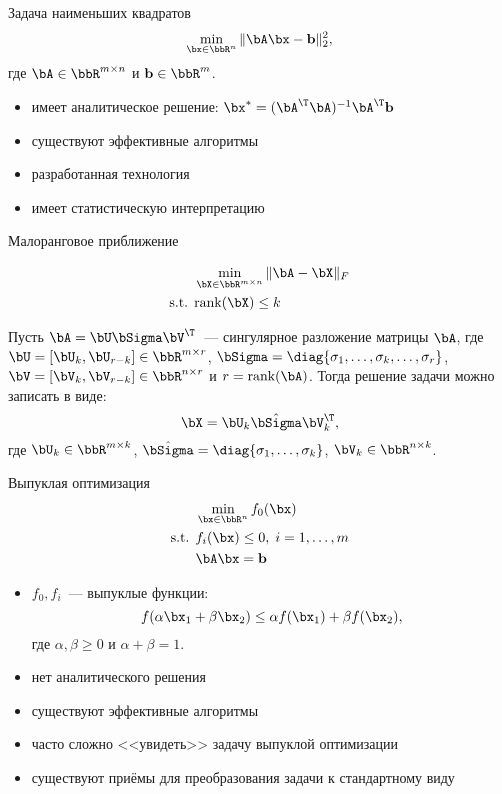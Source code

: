 \documentclass[12pt]{beamer}
\begin{document}
\begin{frame}{Задача наименьших квадратов}
\begin{equation*}
\min\limits_{\bx \in \bbR^n} \|\bA\bx - \mathbf{b} \|^2_2,
\label{eq::least_sq}
\end{equation*}
где $\bA \in \bbR^{m \times n}$ и $\mathbf{b} \in \bbR^m$.
\begin{itemize}
\item имеет аналитическое решение: $\bx^* = (\bA^{\T}\bA)^{-1}\bA^{\T}\mathbf{b}$
\item существуют эффективные алгоритмы
\item разработанная технология
\item имеет статистическую интерпретацию
\end{itemize}
\end{frame}

\begin{frame}{Малоранговое приближение}

\begin{equation*}
\begin{split}
&\min\limits_{\bX \in \bbR^{m \times n}} \|\bA - \bX \|_F \\
\text{s.t. } & \text{rank}(\bX) \leq k
\end{split}
\end{equation*}

\begin{Th}
Пусть $\bA = \bU\bSigma\bV^{\T}$~--- сингулярное разложение матрицы $\bA$, где $\bU = [\bU_k, \bU_{r-k}] \in \bbR^{m \times r}$, $\bSigma = \diag{\sigma_1, \ldots, \sigma_k, \ldots, \sigma_r}$, $\bV = [\bV_k, \bV_{r - k}] \in \bbR^{n \times r}$ и $r = \text{rank}(\bA)$.  Тогда решение задачи можно записать в виде:
\[
\bX = \bU_k \hat{\bSigma} \bV^{\T}_k,
\]
где $\bU_k \in \bbR^{m \times k}$, $\hat{\bSigma} = \diag{\sigma_1, \ldots, \sigma_k}$, $\bV_k \in \bbR^{n \times k}$.
\end{Th}
\end{frame}

\begin{frame}{Выпуклая оптимизация}
\begin{equation*}
\begin{split}
&\min\limits_{\bx \in \bbR^n} f_0(\bx)\\
\text{s.t. } & f_i(\bx) \leq 0, \; i = 1,\ldots, m\\
& \bA\bx = \mathbf{b}
\end{split}
\label{eq::conv_opt}
\end{equation*}
\begin{itemize}[<+->]
\item $f_0, f_i$~--- выпуклые функции:
\[
f(\alpha \bx_1 + \beta \bx_2) \leq \alpha f(\bx_1) + \beta f(\bx_2),
\]
где $\alpha, \beta \geq 0$ и $\alpha + \beta = 1$.
\item нет аналитического решения
\item существуют эффективные алгоритмы
\item часто сложно <<увидеть>> задачу выпуклой оптимизации
\item существуют приёмы для преобразования задачи к стандартному виду
\end{itemize}
\end{frame}
\end{document}
